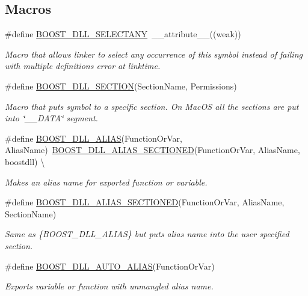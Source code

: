 \subsection*{Macros}
\begin{DoxyCompactItemize}
\item 
\#define \hyperlink{a00200_a18e217f7c26bce9cb08c64f41fbd6178}{B\+O\+O\+S\+T\+\_\+\+D\+L\+L\+\_\+\+S\+E\+L\+E\+C\+T\+A\+NY}~\+\_\+\+\_\+attribute\+\_\+\+\_\+((weak))
\begin{DoxyCompactList}\small\item\em Macro that allows linker to select any occurrence of this symbol instead of failing with \textquotesingle{}multiple definitions\textquotesingle{} error at linktime. \end{DoxyCompactList}\item 
\#define \hyperlink{a00200_a77c8964c8b614e76a662bb500babac74}{B\+O\+O\+S\+T\+\_\+\+D\+L\+L\+\_\+\+S\+E\+C\+T\+I\+ON}(Section\+Name,  Permissions)
\begin{DoxyCompactList}\small\item\em Macro that puts symbol to a specific section. On Mac\+OS all the sections are put into \char`\"{}\+\_\+\+\_\+\+D\+A\+T\+A\char`\"{} segment. \end{DoxyCompactList}\item 
\#define \hyperlink{a00200_ad9f8b1de81ae3b24cd938c7bacb27eef}{B\+O\+O\+S\+T\+\_\+\+D\+L\+L\+\_\+\+A\+L\+I\+AS}(Function\+Or\+Var,  Alias\+Name)~\hyperlink{a00200_af10683bc3be11abe1957b186fcec2bd2}{B\+O\+O\+S\+T\+\_\+\+D\+L\+L\+\_\+\+A\+L\+I\+A\+S\+\_\+\+S\+E\+C\+T\+I\+O\+N\+ED}(Function\+Or\+Var, Alias\+Name, boostdll)       \textbackslash{}
\begin{DoxyCompactList}\small\item\em Makes an alias name for exported function or variable. \end{DoxyCompactList}\item 
\#define \hyperlink{a00200_af10683bc3be11abe1957b186fcec2bd2}{B\+O\+O\+S\+T\+\_\+\+D\+L\+L\+\_\+\+A\+L\+I\+A\+S\+\_\+\+S\+E\+C\+T\+I\+O\+N\+ED}(Function\+Or\+Var,  Alias\+Name,  Section\+Name)
\begin{DoxyCompactList}\small\item\em Same as \{B\+O\+O\+S\+T\+\_\+\+D\+L\+L\+\_\+\+A\+L\+I\+AS\} but puts alias name into the user specified section. \end{DoxyCompactList}\item 
\#define \hyperlink{a00200_af6db740861079eab68b0629d98d74cd8}{B\+O\+O\+S\+T\+\_\+\+D\+L\+L\+\_\+\+A\+U\+T\+O\+\_\+\+A\+L\+I\+AS}(Function\+Or\+Var)
\begin{DoxyCompactList}\small\item\em Exports variable or function with unmangled alias name. \end{DoxyCompactList}\end{DoxyCompactItemize}


